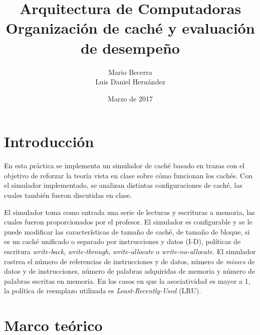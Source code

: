 \documentclass{article}
\title{\textbf{Arquitectura de Computadoras} \\ 
Organización de caché y evaluación de desempeño}
\author{Mario Becerra \\ Luis Daniel Hernández}
\date{Marzo de 2017}
\begin{document}
\npthousandsep{,}

\maketitle

\section{Introducción}


En esta práctica se implementa un simulador de caché basado en trazas con el objetivo de reforzar la teoría vista en clase sobre cómo funcionan los cachés. Con el simulador implementado, se analizan distintas configuraciones de caché, las cuales también fueron discutidas en clase.

El simulador toma como entrada una serie de lecturas y escrituras a memoria, las cuales fueron proporcionados por el profesor. El simulador es configurable y se le puede modificar las características de tamaño de caché, de tamaño de bloque, si es un caché unificado o separado por instrucciones y datos (I-D), políticas de escritura \textit{write-back}, \textit{write-through}, \textit{write-allocate} o \textit{write-no-allocate}. El simulador rastrea el número de referencias de instrucciones y de datos, número de \textit{misses} de datos y de instrucciones, número de palabras adquiridas de memoria y número de palabras escritas en memoria. En los casos en que la asociatividad es mayor a 1, la política de reemplazo utilizada es \textit{Least-Recently-Used} (LRU).



\section{Marco teórico}

\end{document}
